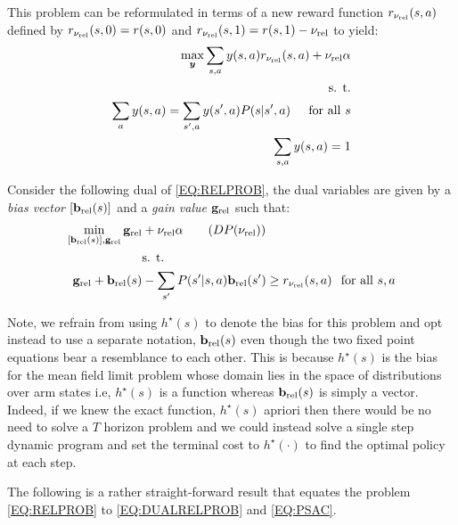 This problem can be reformulated in terms of a new reward function $r_{\mathbf{\nu_{\text{rel}}}}(s, a)$ defined by $r_{\mathbf{\nu_{\text{rel}}}}(s, 0) = r(s, 0)$ and $r_{\mathbf{\nu_{\text{rel}}}}(s, 1) = r(s, 1) - \mathbf{\nu_{\text{rel}}}$ to yield:
\begin{align}
    \max_{{\bm{y}}} \sum_{s, a} y(s, a) r_{\mathbf{\nu_{\text{rel}}}}(s, a) + \mathbf{\nu_{\text{rel}}}\alpha \\
    \text{s. t.} \nonumber \\
    \sum_{a} y(s, a) = \sum_{s', a} y(s', a) P(s|s', a) \hspace{0.2 in} \text{for all $s$} \nonumber\\
    \sum_{s, a} y(s, a) = 1 \nonumber
\end{align}

Consider the following dual of \eqref{EQ:RELPROB}, the dual variables are given by a \emph{bias vector} $[\mathbf{b}_{\text{rel}}(s)]$ and a \emph{gain value} $\mathbf{g}_{\text{rel}}$ such that:
\begin{align}\label{EQ:DUALRELPROB}
    \min_{[\biasvec{s}], \gainrel} \gainrel& + \laghomosub \alpha \tag{$DP(\laghomosub)$}\\
    &\text{s. t.} \nonumber \\
    \gainrel + \biasvec{s}& - \sum_{s'} P(s'|s, a) \biasvec{s'} \geq r_{\laghomosub}(s, a) \hspace{0.1 in} \text{for all $s, a$}\nonumber
\end{align}

\begin{remark}
    Note, we refrain from using $h^{\star}(s)$ to denote the bias for this problem and opt instead to use a separate notation, $\mathbf{b}_{\text{rel}}(s)$ even though the two fixed point equations bear a resemblance to each other. This is because $h^{\star}(s)$ is the bias for the mean field limit problem whose domain lies in the space of distributions over arm states i.e, $h^{\star}(s)$ is a function whereas $\mathbf{b}_{\text{rel}}(s)$ is simply a vector. Indeed, if we knew the exact function, $h^{\star}(s)$ apriori then there would be no need to solve a $T$ horizon problem and we could instead solve a single step dynamic program and set the terminal cost to $h^{\star}(\cdot)$ to find the optimal policy at each step. %
\end{remark}

The following is a rather straight-forward result that equates the problem \eqref{EQ:RELPROB} to \eqref{EQ:DUALRELPROB} and \eqref{EQ:PSAC}.


